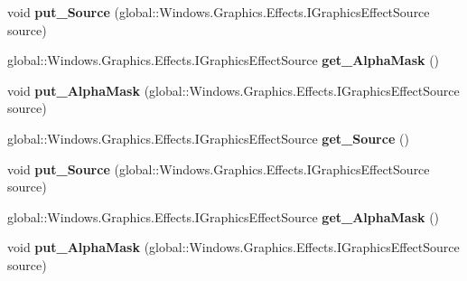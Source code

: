 \begin{DoxyCompactItemize}
void {\bfseries put\+\_\+\+Source} (global\+::\+Windows.\+Graphics.\+Effects.\+I\+Graphics\+Effect\+Source source)
\item 
\mbox{\label{interface_microsoft_1_1_graphics_1_1_canvas_1_1_effects_1_1_i_alpha_mask_effect_a2ec5e6658267b1e3270f21e97ad18181}} 
global\+::\+Windows.\+Graphics.\+Effects.\+I\+Graphics\+Effect\+Source {\bfseries get\+\_\+\+Alpha\+Mask} ()
\item 
\mbox{\label{interface_microsoft_1_1_graphics_1_1_canvas_1_1_effects_1_1_i_alpha_mask_effect_a1057d37b21df4170ef6ae26c9fa68624}} 
void {\bfseries put\+\_\+\+Alpha\+Mask} (global\+::\+Windows.\+Graphics.\+Effects.\+I\+Graphics\+Effect\+Source source)
\item 
\mbox{\label{interface_microsoft_1_1_graphics_1_1_canvas_1_1_effects_1_1_i_alpha_mask_effect_ac93fcaf27f7daab93dd8e361bb5e9bbf}} 
global\+::\+Windows.\+Graphics.\+Effects.\+I\+Graphics\+Effect\+Source {\bfseries get\+\_\+\+Source} ()
\item 
\mbox{\label{interface_microsoft_1_1_graphics_1_1_canvas_1_1_effects_1_1_i_alpha_mask_effect_ab4e559cfdcb7d7d7f1565fcc913c7608}} 
void {\bfseries put\+\_\+\+Source} (global\+::\+Windows.\+Graphics.\+Effects.\+I\+Graphics\+Effect\+Source source)
\item 
\mbox{\label{interface_microsoft_1_1_graphics_1_1_canvas_1_1_effects_1_1_i_alpha_mask_effect_a2ec5e6658267b1e3270f21e97ad18181}} 
global\+::\+Windows.\+Graphics.\+Effects.\+I\+Graphics\+Effect\+Source {\bfseries get\+\_\+\+Alpha\+Mask} ()
\item 
\mbox{\label{interface_microsoft_1_1_graphics_1_1_canvas_1_1_effects_1_1_i_alpha_mask_effect_a1057d37b21df4170ef6ae26c9fa68624}} 
void {\bfseries put\+\_\+\+Alpha\+Mask} (global\+::\+Windows.\+Graphics.\+Effects.\+I\+Graphics\+Effect\+Source source)

\end{DoxyCompactItemize}
